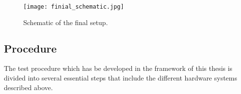 \begin{figure}[!htb]
   \centering   
   \texttt{[image: finial\_schematic.jpg]}
   \caption{Schematic of the final setup.}
   \label{finial_schematic}
\end{figure} 

\subsection{Procedure}
\label{sec:proc}
The test procedure which has be developed in the framework of this thesis is divided into several essential steps that include the different hardware systems described above.
